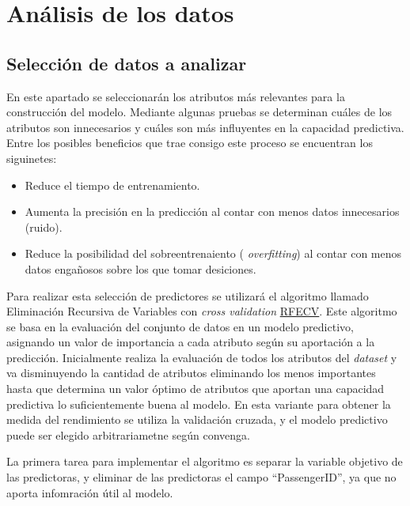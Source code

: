\documentclass[11pt]{article}
\providecommand{\tightlist}{%
      \setlength{\itemsep}{0pt}\setlength{\parskip}{0pt}}
\begin{document}
    \hypertarget{anuxe1lisis-de-los-datos}{%
\section{Análisis de los datos}\label{anuxe1lisis-de-los-datos}}

    \hypertarget{selecciuxf3n-de-datos-a-analizar}{%
\subsection{Selección de datos a
analizar}\label{selecciuxf3n-de-datos-a-analizar}}

En este apartado se seleccionarán los atributos más relevantes para la
construcción del modelo. Mediante algunas pruebas se determinan cuáles
de los atributos son innecesarios y cuáles son más influyentes en la
capacidad predictiva. Entre los posibles beneficios que trae consigo
este proceso se encuentran los siguinetes:

\begin{itemize}
\tightlist
\item
  Reduce el tiempo de entrenamiento.
\item
  Aumenta la precisión en la predicción al contar con menos datos
  innecesarios (ruido).
\item
  Reduce la posibilidad del sobreentrenaiento ( \emph{overfitting}) al
  contar con menos datos engañosos sobre los que tomar desiciones.
\end{itemize}

Para realizar esta selección de predictores se utilizará el algoritmo
llamado Eliminación Recursiva de Variables con \emph{cross validation}
\href{https://scikit-learn.org/stable/modules/generated/sklearn.feature_selection.RFECV.html\#sklearn.feature_selection.RFECV}{RFECV}.
Este algoritmo se basa en la evaluación del conjunto de datos en un
modelo predictivo, asignando un valor de importancia a cada atributo
según su aportación a la predicción. Inicialmente realiza la evaluación
de todos los atributos del \emph{dataset} y va disminuyendo la cantidad
de atributos eliminando los menos importantes hasta que determina un
valor óptimo de atributos que aportan una capacidad predictiva lo
suficientemente buena al modelo. En esta variante para obtener la medida
del rendimiento se utiliza la validación cruzada, y el modelo predictivo
puede ser elegido arbitrariametne según convenga.

    La primera tarea para implementar el algoritmo es separar la variable
objetivo de las predictoras, y eliminar de las predictoras el campo
``PassengerID'', ya que no aporta infomración útil al modelo.
\end{document}
